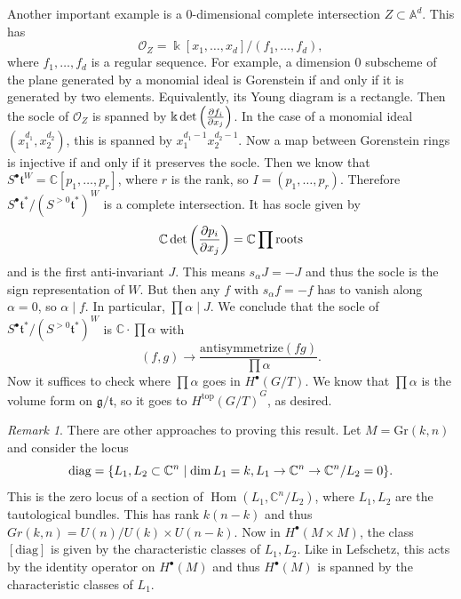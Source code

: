 \documentclass[leqno, openany]{memoir}
\theoremstyle{definition}
\theoremstyle{remark}
\newtheorem{rmk}[thm]{Remark}
\theoremstyle{plain}
\theoremstyle{definition}
\theoremstyle{remark}
\newcommand{\A}{\mathbb{A}}
\newcommand{\C}{\mathbb{C}}
\renewcommand{\k}{\Bbbk}
\newcommand{\mc}[1]{\mathcal{#1}}
\newcommand{\mf}[1]{\mathfrak{#1}}
\newcommand{\mr}[1]{\mathrm{#1}}
\DeclareMathOperator{\Hom}{Hom}
\begin{document}
Another important example is a $0$-dimensional complete intersection $Z \subset \A^d$. This has 
\[ \mc{O}_Z = \k[x_1, \ldots, x_d]/(f_1, \ldots, f_d), \] 
where $f_1, \ldots, f_d$ is a regular sequence. For example, a dimension $0$ subscheme of the plane generated by a monomial ideal is Gorenstein if and only if it is generated by two elements. Equivalently, its Young diagram is a rectangle. Then the socle of $\mc{O}_Z$ is spanned by $\k \det \qty( \pdv{f_i}{x_j} )$. In the case of a monomial ideal $(x_1^{d_1}, x_2^{d_2})$, this is spanned by $x_1^{d_1-1} x_2^{d_2-1}$. Now a map between Gorenstein rings is injective if and only if it preserves the socle. Then we know that $S^{\bullet} \mf{t}^W = \C[p_1, \ldots, p_r]$, where $r$ is the rank, so $I = (p_1, \ldots, p_r)$. Therefore $S^{\bullet} \mf{t}^* / {(S^{>0}\mf{t}^*)}^W$ is a complete intersection. It has socle given by
\[ \C \det \qty( \pdv{p_i}{x_j} ) = \C \prod \text{roots} \]
and is the first anti-invariant $J$. This means $s_{\alpha} J = -J$ and thus the socle is the sign representation of $W$. But then any $f$ with $s_{\alpha} f = -f$ has to vanish along $\alpha = 0$, so $\alpha \mid f$. In particular, $\prod \alpha \mid J$. We conclude that the socle of $S^{\bullet} \mf{t}^* / {(S^{>0} \mf{t}^*)}^W$ is $\C \cdot \prod \alpha$ with 
\[ (f,g) \to \frac{\text{antisymmetrize}(fg)}{\prod \alpha}. \]
Now it suffices to check where $\prod \alpha$ goes in $H^{\bullet}(G/T)$. We know that $\prod \alpha$ is the volume form on $\mf{g}/\mf{t}$, so it goes to ${ H^{\mr{top}}(G/T) }^G$, as desired.

\begin{rmk}
    There are other approaches to proving this result. Let $M = \mr{Gr}(k, n)$ and consider the locus
    \[ \text{diag} = \qty{L_1, L_2 \subset \C^n \mid \dim L_1 = k, L_1 \to \C^n \to \C^n/L_2 = 0}. \]
    This is the zero locus of a section of $\Hom(L_1, \C^n/L_2)$, where $L_1, L_2$ are the tautological bundles. This has rank $k(n-k)$ and thus $Gr(k, n) = U(n)/U(k) \times U(n-k)$. Now in $H^{\bullet}(M \times M)$, the class $[\text{diag}]$ is given by the characteristic classes of $L_1, L_2$. Like in Lefschetz, this acts by the identity operator on $H^{\bullet}(M)$ and thus $H^{\bullet}(M)$ is spanned by the characteristic classes of $L_1$.
\end{rmk}
\end{document}
